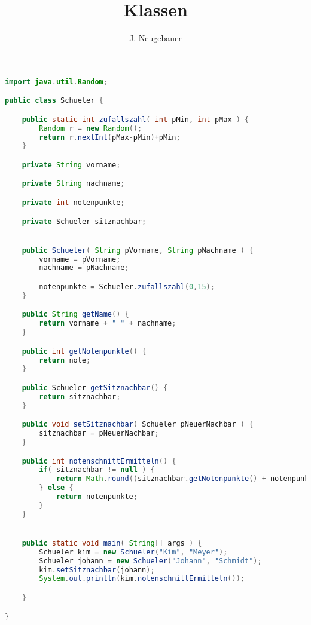 \documentclass[10pt, a4paper, landscape, twocolumn]{scrartcl}
\author{J. Neugebauer}
\title{Klassen}
\date{\Heute}
\begin{document}
\begin{lstlisting}[language=Java,frame=none]
import java.util.Random;

public class Schueler {

	public static int zufallszahl( int pMin, int pMax ) {
		Random r = new Random();
		return r.nextInt(pMax-pMin)+pMin;
	}

	private String vorname;

	private String nachname;

	private int notenpunkte;

	private Schueler sitznachbar;


	public Schueler( String pVorname, String pNachname ) {
		vorname = pVorname;
		nachname = pNachname;

		notenpunkte = Schueler.zufallszahl(0,15);
	}

	public String getName() {
		return vorname + " " + nachname;
	}

	public int getNotenpunkte() {
		return note;
	}

	public Schueler getSitznachbar() {
		return sitznachbar;
	}

	public void setSitznachbar( Schueler pNeuerNachbar ) {
		sitznachbar = pNeuerNachbar;
	}

	public int notenschnittErmitteln() {
		if( sitznachbar != null ) {
			return Math.round((sitznachbar.getNotenpunkte() + notenpunkte)/2);
		} else {
			return notenpunkte;
		}
	}


	public static void main( String[] args ) {
		Schueler kim = new Schueler("Kim", "Meyer");
		Schueler johann = new Schueler("Johann", "Schmidt");
		kim.setSitznachbar(johann);
		System.out.println(kim.notenschnittErmitteln());

	}

}
\end{lstlisting}
\end{document}
